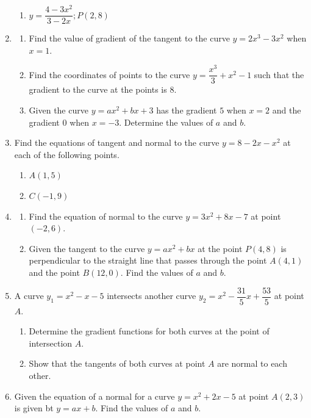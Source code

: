 \documentclass{report}
\begin{document}
\begin{multicols}{2}
\begin{enumerate}
\begin{enumerate}
                        \item $y = \dfrac{4 - 3x^2}{3-2x}; P(2, 8)$
                  \end{enumerate}
            \item \begin{enumerate}
                        \item Find the value of gradient of the tangent to the curve $y = 2x^3 - 3x^2$ when
                              $x = 1$.
                        \item Find the coordinates of points to the curve $y = \dfrac{x^3}{3} + x^2 - 1$ such
                              that the gradient to the curve at the points is $8$.
                        \item Given the curve $y = ax^2 + bx + 3$ has the gradient $5$ when $x = 2$ and the
                              gradient $0$ when $x = -3$. Determine the values of $a$ and $b$.
                  \end{enumerate}
            \item Find the equations of tangent and normal to the curve $y = 8 - 2x - x^2$ at
                  each of the following points.
                  \begin{enumerate}
                        \item $A(1, 5)$
                        \item $C(-1, 9)$
                  \end{enumerate}
            \item \begin{enumerate}
                        \item Find the equation of normal to the curve $y = 3x^2 + 8x - 7$ at point $(-2,
                                    6)$.
                        \item Given the tangent to the curve $y = ax^2 + bx$ at the point $P(4, 8)$ is
                              perpendicular to the straight line that passes through the point $A(4, 1)$ and
                              the point $B(12, 0)$. Find the values of $a$ and $b$.
                  \end{enumerate}
            \item A curve $y_1 = x^2 - x - 5$ intersects another curve $y_2 = x^2 -
                        \dfrac{31}{5}x + \dfrac{53}{5}$ at point $A$.
                  \begin{enumerate}
                        \item Determine the gradient functions for both curves at the point of intersection
                              $A$.
                        \item Show that the tangents of both curves at point $A$ are normal to each other.
                  \end{enumerate}
            \item Given the equation of a normal for a curve $y = x^2 + 2x - 5$ at point $A(2,
                        3)$ is given bt $y = ax + b$. Find the values of $a$ and $b$.
      \end{enumerate}

\end{multicols}
\end{document}
